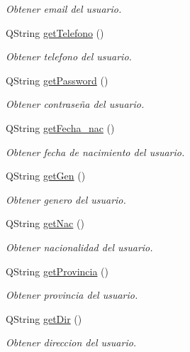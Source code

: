 \begin{DoxyCompactItemize}
\begin{DoxyCompactList}\small\item\em Obtener email del usuario. \end{DoxyCompactList}\item 
Q\+String \mbox{\hyperlink{classUser_a94361359fc402cecf21f3ac7189121d7}{get\+Telefono}} ()
\begin{DoxyCompactList}\small\item\em Obtener telefono del usuario. \end{DoxyCompactList}\item 
Q\+String \mbox{\hyperlink{classUser_a96d673c7c62ecdfdd4c509db8350262d}{get\+Password}} ()
\begin{DoxyCompactList}\small\item\em Obtener contraseña del usuario. \end{DoxyCompactList}\item 
Q\+String \mbox{\hyperlink{classUser_a038bc7578cc67dc65dcc37cab56011cc}{get\+Fecha\+\_\+nac}} ()
\begin{DoxyCompactList}\small\item\em Obtener fecha de nacimiento del usuario. \end{DoxyCompactList}\item 
Q\+String \mbox{\hyperlink{classUser_af6978ab530e6b4516575c569245e1cb1}{get\+Gen}} ()
\begin{DoxyCompactList}\small\item\em Obtener genero del usuario. \end{DoxyCompactList}\item 
Q\+String \mbox{\hyperlink{classUser_a35bb4fee2f8b12cf69eb25b7949cd85c}{get\+Nac}} ()
\begin{DoxyCompactList}\small\item\em Obtener nacionalidad del usuario. \end{DoxyCompactList}\item 
Q\+String \mbox{\hyperlink{classUser_a539732e0d7d830e5027648c429c7d1ff}{get\+Provincia}} ()
\begin{DoxyCompactList}\small\item\em Obtener provincia del usuario. \end{DoxyCompactList}\item 
Q\+String \mbox{\hyperlink{classUser_a1bbfd504de0babb6591de36bc7994673}{get\+Dir}} ()
\begin{DoxyCompactList}\small\item\em Obtener direccion del usuario. \end{DoxyCompactList}\item 

\end{DoxyCompactItemize}
